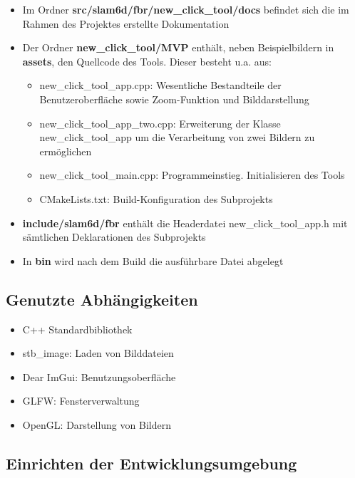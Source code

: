 \documentclass[a4paper,10pt]{scrartcl}
\begin{document}
\begin{itemize}
	\item Im Ordner \textbf{src/slam6d/fbr/new\_click\_tool/docs} befindet sich die im Rahmen des Projektes erstellte Dokumentation
	\item Der Ordner \textbf{new\_click\_tool/MVP} enthält, neben Beispielbildern in \textbf{assets}, den Quellcode des Tools. Dieser besteht u.a. aus:
	\begin{itemize}
		\item new\_click\_tool\_app.cpp: Wesentliche Bestandteile der Benutzeroberfläche sowie Zoom-Funktion und Bilddarstellung
		\item new\_click\_tool\_app\_two.cpp: Erweiterung der Klasse new\_click\_tool\_app um die Verarbeitung von zwei Bildern zu ermöglichen
		\item new\_click\_tool\_main.cpp: Programmeinstieg. Initialisieren des Tools
		\item CMakeLists.txt: Build-Konfiguration des Subprojekts
	\end{itemize}
	
	\item \textbf{include/slam6d/fbr} enthält die Headerdatei new\_click\_tool\_app.h mit sämtlichen Deklarationen des Subprojekts
	\item In \textbf{bin} wird nach dem Build die ausführbare Datei abgelegt
\end{itemize}



\subsection{Genutzte Abhängigkeiten}

\begin{itemize}
    \item C++ Standardbibliothek
    \item stb\_image: Laden von Bilddateien
    \item Dear ImGui: Benutzungsoberfläche
    \item GLFW: Fensterverwaltung
    \item OpenGL: Darstellung von Bildern

\end{itemize}

\subsection{Einrichten der Entwicklungsumgebung}
\end{document}
